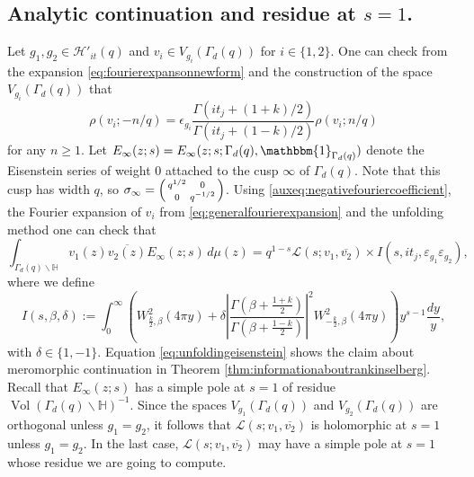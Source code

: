\documentclass{article}
\theoremstyle{named}
\newcommand{\HH}{\mathcal{H}}
\renewcommand{\L}{\mathcal{L}}
\newcommand{\Hyp}{\mathbb{H}}
\DeclareMathOperator{\vol}{Vol}
\begin{document}
\subsection{Analytic continuation and residue at $s = 1$.}
Let $g_1, g_2 \in \HH'_{it}(q)$ and $v_i \in V_{g_i}(\Gamma_d(q))$ for $i \in \{1, 2\}$. 
One can check from the expansion \eqref{eq:fourierexpansonnewform} and the construction of the space $V_{g_i}(\Gamma_d(q))$ that 
\begin{equation}\label{auxeq:negativefouriercoefficient}
    \rho(v_i; -n/q) = \epsilon_{g_i} \frac{\Gamma(it_j + (1 + k)/2)}{\Gamma(it_j + (1 - k)/2)} \rho(v_i; n/q)
\end{equation}
for any $n \geq 1$. Let $E_\infty(z; s) = E_\infty(z; s; \Gamma_d(q), \mathbbm{1}_{\Gamma_d(q)})$ denote the Eisenstein series of weight $0$ attached to the cusp $\infty$ of $\Gamma_d(q)$. Note that this cusp has width $q$, so $\sigma_\infty = \begin{psmallmatrix}
q^{1/2}& 0\\
0 & q^{-1/2}
\end{psmallmatrix}$. Using \eqref{auxeq:negativefouriercoefficient}, the Fourier expansion of $v_i$ from \eqref{eq:generalfourierexpansion} and the unfolding method one can check that  
\begin{equation}\label{eq:unfoldingeisenstein}
    \int_{\Gamma_d(q)\backslash \Hyp} v_1(z)\overline{v_2(z)} E_\infty(z; s) \, d\mu(z) = q^{1-s}\L(s; v_1, \overline{v_2}) \times I(s, it_j, \varepsilon_{g_1}\varepsilon_{g_2}), 
\end{equation}
where we define
\begin{equation*}
    I(s, \beta, \delta) := \int_0^\infty \left(W_{\frac{k}{2}, \beta}^2 (4\pi y) + \delta\left|\frac{\Gamma\left(\beta + \frac{1 + k}{2}\right)}{\Gamma\left(\beta + \frac{1- k}{2}\right)}\right|^2 W^2_{-\frac{k}{2}, \beta}(4\pi y)\right)y^{s-1}\frac{dy}{y},
\end{equation*}
with $\delta \in \{1, -1\}$. Equation \eqref{eq:unfoldingeisenstein} shows the claim about meromorphic continuation in Theorem \ref{thm:informationaboutrankinselberg}. Recall that $E_\infty(z; s)$ has a simple pole at $s = 1$ of residue $\vol(\Gamma_d(q)\backslash \Hyp)^{-1}$. Since the spaces $V_{g_1}(\Gamma_d(q))$ and $V_{g_2}(\Gamma_d(q))$ are orthogonal unless $g_1 = g_2$, it follows that $\L(s; v_1, \overline{v_2})$ is holomorphic at $s = 1$ unless $g_1 = g_2$. In the last case, $\L(s; v_1, \overline{v_2})$ may have a simple pole at $s = 1$ whose residue we are going to compute. 
\end{document}

